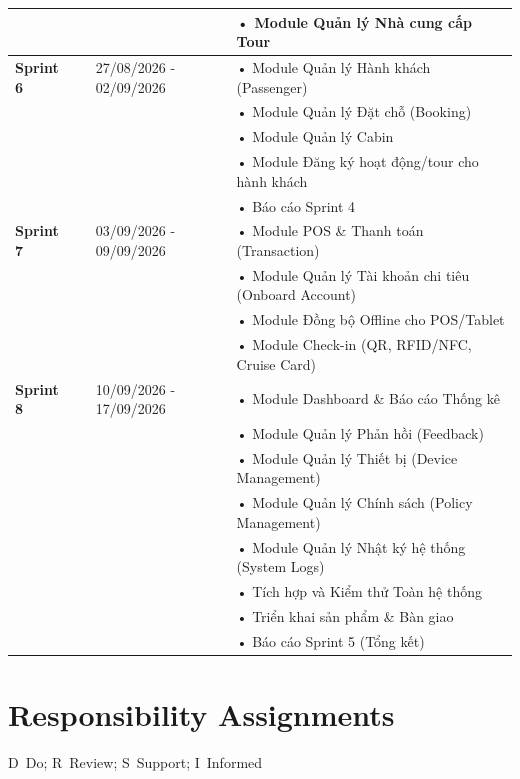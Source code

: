 \documentclass[a4paper,12pt]{article}
\begin{document}
\begin{longtable}{p{1cm} p{5cm} p{4cm} p{6cm}}
		& & & • Module Quản lý Nhà cung cấp Tour \\
		\midrule
		\textbf{Sprint 6} & & 27/08/2026 - 02/09/2026 & • Module Quản lý Hành khách (Passenger) \\
		& & & • Module Quản lý Đặt chỗ (Booking) \\
		& & & • Module Quản lý Cabin \\
		& & & • Module Đăng ký hoạt động/tour cho hành khách \\
		& & & • Báo cáo Sprint 4 \\
		\midrule
		\textbf{Sprint 7} & & 03/09/2026 - 09/09/2026 & • Module POS \& Thanh toán (Transaction) \\
		& & & • Module Quản lý Tài khoản chi tiêu (Onboard Account) \\
		& & & • Module Đồng bộ Offline cho POS/Tablet \\
		& & & • Module Check-in (QR, RFID/NFC, Cruise Card) \\
		\midrule
		\textbf{Sprint 8} & & 10/09/2026 - 17/09/2026 & • Module Dashboard \& Báo cáo Thống kê \\
		& & & • Module Quản lý Phản hồi (Feedback) \\
		& & & • Module Quản lý Thiết bị (Device Management) \\
		& & & • Module Quản lý Chính sách (Policy Management) \\
		& & & • Module Quản lý Nhật ký hệ thống (System Logs) \\
		& & & • Tích hợp và Kiểm thử Toàn hệ thống \\
		& & & • Triển khai sản phẩm \& Bàn giao \\
		& & & • Báo cáo Sprint 5 (Tổng kết) \\
		\hline
	\end{longtable}
	
	\newpage
	
	\section{Responsibility Assignments}
	
	\noindent D~Do; R~Review; S~Support; I~Informed
	
\end{document}
